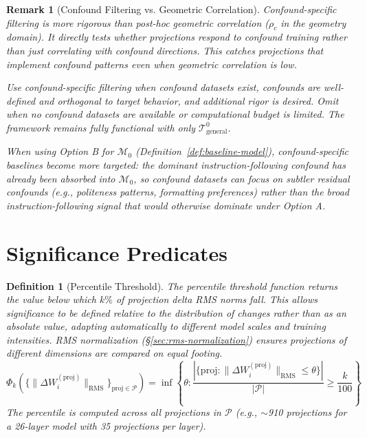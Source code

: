 \documentclass[11pt]{article}
\newtheorem{definition}{Definition}[section]
\newtheorem{remark}{Remark}[section]
\begin{document}
\begin{remark}[Confound Filtering vs. Geometric Correlation]
Confound-specific filtering is more rigorous than post-hoc geometric correlation ($\rho_c$ in the geometry domain). It directly tests whether projections respond to confound \emph{training} rather than just correlating with confound directions. This catches projections that implement confound patterns even when geometric correlation is low.

Use confound-specific filtering when confound datasets exist, confounds are well-defined and orthogonal to target behavior, and additional rigor is desired. Omit when no confound datasets are available or computational budget is limited. The framework remains fully functional with only $\mathcal{T}^0_{\text{general}}$.

When using Option B for $\mathcal{M}_0$ (Definition~\ref{def:baseline-model}), confound-specific baselines become more targeted: the dominant instruction-following confound has already been absorbed into $\mathcal{M}_0$, so confound datasets can focus on subtler residual confounds (e.g., politeness patterns, formatting preferences) rather than the broad instruction-following signal that would otherwise dominate under Option A.
\end{remark}

\section{Significance Predicates}
\label{app:significance}

\begin{definition}[Percentile Threshold]
\label{def:percentile-threshold}
The percentile threshold function returns the value below which $k\%$ of projection delta RMS norms fall. This allows significance to be defined relative to the distribution of changes rather than as an absolute value, adapting automatically to different model scales and training intensities. RMS normalization (\S\ref{sec:rms-normalization}) ensures projections of different dimensions are compared on equal footing.
\begin{equation}
\Phi_k(\{\|\Delta W^{(\text{proj})}_i\|_{\text{RMS}}\}_{\text{proj} \in \mathcal{P}}) = \inf\left\{\theta : \frac{|\{\text{proj} : \|\Delta W^{(\text{proj})}_i\|_{\text{RMS}} \leq \theta\}|}{|\mathcal{P}|} \geq \frac{k}{100}\right\}
\end{equation}
The percentile is computed across all projections in $\mathcal{P}$ (e.g., $\sim$910 projections for a 26-layer model with 35 projections per layer).
\end{definition}
\end{document}
